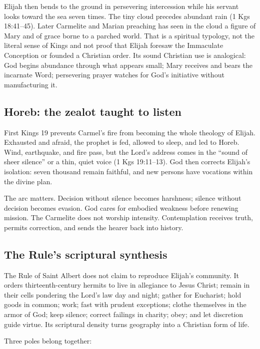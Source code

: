 Elijah then bends to the ground in persevering intercession while his servant looks toward the sea seven times. The tiny cloud precedes abundant rain (1 Kgs 18:41--45). Later Carmelite and Marian preaching has seen in the cloud a figure of Mary and of grace borne to a parched world. That is a spiritual typology, not the literal sense of Kings and not proof that Elijah foresaw the Immaculate Conception or founded a Christian order. Its sound Christian use is analogical: God begins abundance through what appears small; Mary receives and bears the incarnate Word; persevering prayer watches for God's initiative without manufacturing it.

\subsection{Horeb: the zealot taught to listen}

First Kings 19 prevents Carmel's fire from becoming the whole theology of Elijah. Exhausted and afraid, the prophet is fed, allowed to sleep, and led to Horeb. Wind, earthquake, and fire pass, but the Lord's address comes in the ``sound of sheer silence'' or a thin, quiet voice (1 Kgs 19:11--13). God then corrects Elijah's isolation: seven thousand remain faithful, and new persons have vocations within the divine plan.

The arc matters. Decision without silence becomes harshness; silence without decision becomes evasion. God cares for embodied weakness before renewing mission. The Carmelite does not worship intensity. Contemplation receives truth, permits correction, and sends the hearer back into history.

\subsection{The Rule's scriptural synthesis}

The Rule of Saint Albert does not claim to reproduce Elijah's community. It orders thirteenth-century hermits to live in allegiance to Jesus Christ; remain in their cells pondering the Lord's law day and night; gather for Eucharist; hold goods in common; work; fast with prudent exceptions; clothe themselves in the armor of God; keep silence; correct failings in charity; obey; and let discretion guide virtue. Its scriptural density turns geography into a Christian form of life.

Three poles belong together:

